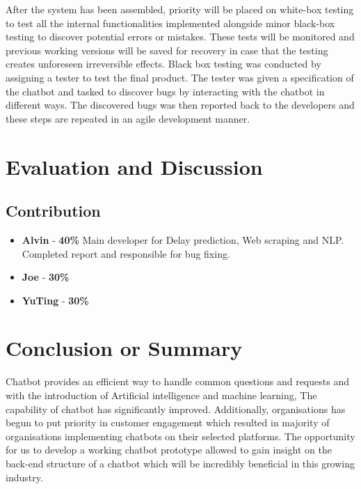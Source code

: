 \documentclass[11pt]{article}
\begin{document}
After the system has been assembled, priority will be placed on white-box testing to test all the internal functionalities implemented alongside minor black-box testing to discover potential errors or mistakes. These tests will be monitored and previous working versions will be saved for recovery in case that the testing creates unforeseen irreversible effects. Black box testing was conducted by assigning a tester to test the final product. The tester was given a specification of the chatbot and tasked to discover bugs by interacting with the chatbot in different ways. The discovered bugs was then reported back to the developers and these steps are repeated in an agile development manner. 

\section{Evaluation and Discussion}
\subsection{Contribution}
\begin{itemize}
	\item \textbf{Alvin}  - \textbf{40\%} Main developer for Delay prediction, Web scraping and NLP. Completed report and responsible for bug fixing.
	\item \textbf{Joe}    - \textbf{30\%}
	\item \textbf{YuTing} - \textbf{30\%}
\end{itemize}

\section{Conclusion or Summary}
Chatbot provides an efficient way to handle common questions and requests and with the introduction of Artificial intelligence and machine learning, The capability of chatbot has significantly improved. Additionally, organisations has begun to put priority in customer engagement which resulted in majority of organisations implementing chatbots on their selected platforms. The opportunity for us to develop a working chatbot prototype allowed to gain insight on the back-end structure of a chatbot which will be incredibly beneficial in this growing industry.


%
 
\end{document}
